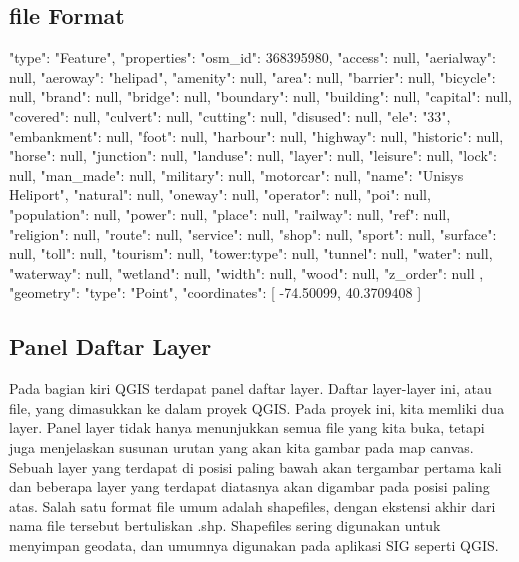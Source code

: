 \subsection{file Format}
{
"type": "Feature",
"properties": {
    "osm_id": 368395980,
    "access": null,
    "aerialway": null,
    "aeroway": "helipad",
    "amenity": null,
    "area": null,
    "barrier": null,
    "bicycle": null,
    "brand": null,
    "bridge": null,
    "boundary": null,
    "building": null,
    "capital": null,
    "covered": null,
    "culvert": null,
    "cutting": null,
    "disused": null,
    "ele": "33",
    "embankment": null,
    "foot": null,
    "harbour": null,
    "highway": null,
    "historic": null,
    "horse": null,
    "junction": null,
    "landuse": null,
    "layer": null,
    "leisure": null,
    "lock": null,
    "man_made": null,
    "military": null,
    "motorcar": null,
    "name": "Unisys Heliport",
    "natural": null,
    "oneway": null,
    "operator": null,
    "poi": null,
    "population": null,
    "power": null,
    "place": null,
    "railway": null,
    "ref": null,
    "religion": null,
    "route": null,
    "service": null,
    "shop": null,
    "sport": null,
    "surface": null,
    "toll": null,
    "tourism": null,
    "tower:type": null,
    "tunnel": null,
    "water": null,
    "waterway": null,
    "wetland": null,
    "width": null,
    "wood": null,
    "z_order": null
},
"geometry": {
    "type": "Point",
    "coordinates": [
        -74.50099,
        40.3709408
    ]
}
}

\subsection{Panel Daftar Layer}
    Pada bagian kiri QGIS terdapat panel daftar layer. Daftar layer-layer ini, atau file, yang dimasukkan ke dalam proyek QGIS. Pada proyek ini, kita memliki dua layer.
    Panel layer tidak hanya menunjukkan semua file yang kita buka, tetapi juga menjelaskan susunan urutan yang akan kita gambar pada map canvas. Sebuah layer yang terdapat di posisi paling bawah akan tergambar pertama kali dan beberapa layer yang terdapat diatasnya akan digambar pada posisi paling atas.
    Salah satu format file umum adalah shapefiles, dengan ekstensi akhir dari nama file tersebut bertuliskan .shp. Shapefiles sering digunakan untuk menyimpan geodata, dan umumnya digunakan pada aplikasi SIG seperti QGIS.

